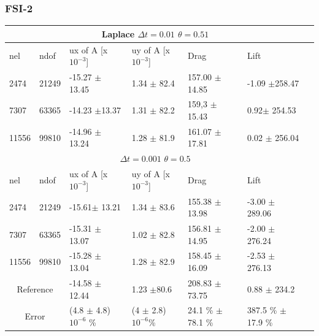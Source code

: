 \subsubsection{FSI-2}
\begin{table}[h!]
\centering
\label{my-label}
\begin{tabular}{ |p{1cm}||p{1cm}|p{3.2cm}|p{3.2cm}|p{2.9cm}|p{3.1cm}|p{1.2cm}|}
 \hline
  \multicolumn{6}{|c|}{Laplace \hspace{2mm} $\Delta t = 0.01$  \hspace{2mm}  $\theta = 0.51$} \\
   \hline
nel & ndof & ux of A [x $10^{-3}$]  &uy of A [x $10^{-3}$]& Drag  & Lift \\
 \hline
 2474    & 21249  & -15.27  $\pm$ 13.45 & 1.34  $\pm$  82.4 & 157.00  $\pm$14.85 & -1.09  $\pm$258.47 \\
 7307    & 63365  &   -14.23  $\pm$13.37 & 1.31   $\pm$ 82.2 & 159,3 $\pm$ 15.43 & 0.92$\pm$ 254.53  \\
 11556   & 99810  & -14.96 $\pm$ 13.24 & 1.28  $\pm$ 81.9 & 161.07 $\pm$  17.81 & 0.02  $\pm$ 256.04  \\
 \hline
  \multicolumn{6}{|c|}{$\Delta t = 0.001$  \hspace{2mm}  $\theta = 0.5$} \\
   \hline
 nel & ndof & ux of A [x $10^{-3}$]  &uy of A [x $10^{-3}$]& Drag  & Lift \\
    \hline
 2474    & 21249  & -15.61$\pm$  13.21 & 1.34  $\pm$ 83.6 & 155.38   $\pm$   13.98 & -3.00  $\pm$   289.06 \\
 7307    & 63365  & -15.31  $\pm$ 13.07 & 1.02    $\pm$  82.8 & 156.81  $\pm$  14.95 & -2.00   $\pm$   276.24 \\
 11556   & 99810  & -15.28   $\pm$  13.04 & 1.28 $\pm$ 82.9 & 158.45  $\pm$  16.09 & -2.53   $\pm$  276.13 \\
 \hline
  \multicolumn{2}{|c|}{Reference} & -14.58 $\pm$ 12.44   & 1.23 $\pm$80.6    & 208.83 $\pm$ 73.75 & 0.88 $\pm$ 234.2 \\
   \hline
    \multicolumn{2}{|c|}{Error}  & (4.8 $\pm$  4.8)$10^{-6}$ \% &  (4 $\pm$ 2.8) $10^{-6}$\% & 24.1 \% $\pm$ 78.1 \% & 387.5 \% $\pm$ 17.9 \%   \\
   \hline
\end{tabular}
\end{table}
